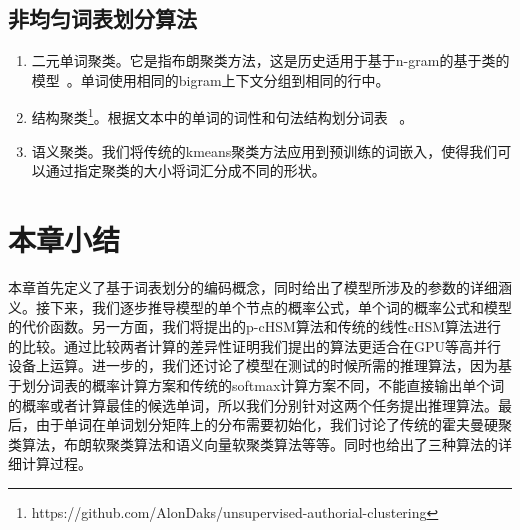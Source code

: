 \subsection{非均匀词表划分算法}
\begin{enumerate}
  \item 二元单词聚类。它是指布朗聚类方法，这是历史适用于基于n-gram的基于类的模型~。单词使用相同的bigram上下文分组到相同的行中。

  \item 结构聚类\footnote{https://github.com/AlonDaks/unsupervised-authorial-clustering}。根据文本中的单词的词性和句法结构划分词表~ 。

  \item 语义聚类。我们将传统的kmeans聚类方法应用到预训练的词嵌入，使得我们可以通过指定聚类的大小将词汇分成不同的形状。
\end{enumerate}

\section{本章小结}
本章首先定义了基于词表划分的编码概念，同时给出了模型所涉及的参数的详细涵义。接下来，我们逐步推导模型的单个节点的概率公式，单个词的概率公式和模型的代价函数。另一方面，我们将提出的p-cHSM算法和传统的线性cHSM算法进行的比较。通过比较两者计算的差异性证明我们提出的算法更适合在GPU等高并行设备上运算。进一步的，我们还讨论了模型在测试的时候所需的推理算法，因为基于划分词表的概率计算方案和传统的softmax计算方案不同，不能直接输出单个词的概率或者计算最佳的候选单词，所以我们分别针对这两个任务提出推理算法。最后，由于单词在单词划分矩阵上的分布需要初始化，我们讨论了传统的霍夫曼硬聚类算法，布朗软聚类算法和语义向量软聚类算法等等。同时也给出了三种算法的详细计算过程。